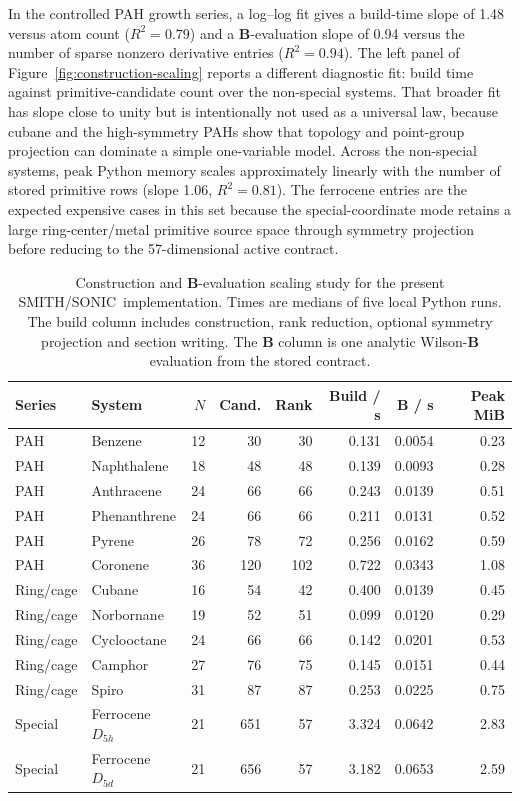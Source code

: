 \documentclass[journal=jctcce,manuscript=article,layout=traditional]{achemso}
\newcommand{\SONIC}{SONIC}
\newcommand{\SMITH}{\textsc{SMITH}}
\newcommand{\Bmat}{\mathbf{B}}
\theoremstyle{definition}
\begin{document}
In the controlled PAH growth series, a log--log fit gives a build-time slope of
1.48 versus atom count (\(R^2=0.79\)) and a \(\Bmat\)-evaluation slope of 0.94
versus the number of sparse nonzero derivative entries (\(R^2=0.94\)).  The
left panel of Figure~\ref{fig:construction-scaling} reports a different
diagnostic fit: build time against primitive-candidate count over the
non-special systems.  That broader fit has slope close to unity but is
intentionally not used as a universal law, because cubane and the high-symmetry
PAHs show that topology and point-group projection can dominate a simple
one-variable model.  Across the non-special systems, peak Python memory scales
approximately linearly with the number of stored primitive rows (slope 1.06,
\(R^2=0.81\)).  The ferrocene entries are the expected expensive
cases in this set because the special-coordinate mode retains a large
ring-center/metal primitive source space through symmetry projection before
reducing to the 57-dimensional active contract.

\begin{table}[htbp]
\centering
\scriptsize
\setlength{\tabcolsep}{3pt}
\caption{Construction and \(\Bmat\)-evaluation scaling study for the present
\SMITH/\SONIC\ implementation.  Times are medians of five local Python runs.
The build column includes construction, rank reduction, optional symmetry
projection and section writing.  The \(\Bmat\) column is one analytic
Wilson-\(\Bmat\) evaluation from the stored contract.}
\label{tab:construction-cost}
\begin{tabular}{@{}llrrrrrr@{}}
\toprule
Series & System & \(N\) & Cand. & Rank & Build / s & \(\Bmat\) / s & Peak MiB \\
\midrule
PAH & Benzene & 12 & 30 & 30 & 0.131 & 0.0054 & 0.23 \\
PAH & Naphthalene & 18 & 48 & 48 & 0.139 & 0.0093 & 0.28 \\
PAH & Anthracene & 24 & 66 & 66 & 0.243 & 0.0139 & 0.51 \\
PAH & Phenanthrene & 24 & 66 & 66 & 0.211 & 0.0131 & 0.52 \\
PAH & Pyrene & 26 & 78 & 72 & 0.256 & 0.0162 & 0.59 \\
PAH & Coronene & 36 & 120 & 102 & 0.722 & 0.0343 & 1.08 \\
Ring/cage & Cubane & 16 & 54 & 42 & 0.400 & 0.0139 & 0.45 \\
Ring/cage & Norbornane & 19 & 52 & 51 & 0.099 & 0.0120 & 0.29 \\
Ring/cage & Cyclooctane & 24 & 66 & 66 & 0.142 & 0.0201 & 0.53 \\
Ring/cage & Camphor & 27 & 76 & 75 & 0.145 & 0.0151 & 0.44 \\
Ring/cage & Spiro & 31 & 87 & 87 & 0.253 & 0.0225 & 0.75 \\
Special & Ferrocene \(D_{5h}\) & 21 & 651 & 57 & 3.324 & 0.0642 & 2.83 \\
Special & Ferrocene \(D_{5d}\) & 21 & 656 & 57 & 3.182 & 0.0653 & 2.59 \\
\bottomrule
\end{tabular}
\end{table}
\end{document}
